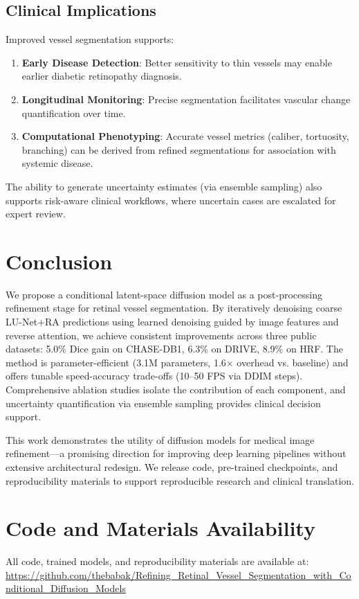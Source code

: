 \documentclass[11pt]{article}
\begin{document}
\subsection{Clinical Implications}

Improved vessel segmentation supports:
\begin{enumerate}
    \item \textbf{Early Disease Detection}: Better sensitivity to thin vessels may enable earlier diabetic retinopathy diagnosis.
    \item \textbf{Longitudinal Monitoring}: Precise segmentation facilitates vascular change quantification over time.
    \item \textbf{Computational Phenotyping}: Accurate vessel metrics (caliber, tortuosity, branching) can be derived from refined segmentations for association with systemic disease.
\end{enumerate}

The ability to generate uncertainty estimates (via ensemble sampling) also supports risk-aware clinical workflows, where uncertain cases are escalated for expert review.

\section{Conclusion}
\label{sec:conclusion}

We propose a conditional latent-space diffusion model as a post-processing refinement stage for retinal vessel segmentation. By iteratively denoising coarse LU-Net+RA predictions using learned denoising guided by image features and reverse attention, we achieve consistent improvements across three public datasets: 5.0\% Dice gain on CHASE-DB1, 6.3\% on DRIVE, 8.9\% on HRF. The method is parameter-efficient (3.1M parameters, 1.6$\times$ overhead vs. baseline) and offers tunable speed-accuracy trade-offs (10--50 FPS via DDIM steps). Comprehensive ablation studies isolate the contribution of each component, and uncertainty quantification via ensemble sampling provides clinical decision support.

This work demonstrates the utility of diffusion models for medical image refinement—a promising direction for improving deep learning pipelines without extensive architectural redesign. We release code, pre-trained checkpoints, and reproducibility materials to support reproducible research and clinical translation.
\section*{Code and Materials Availability}
All code, trained models, and reproducibility materials are available at: 
\url{https://github.com/thebabak/Refining_Retinal_Vessel_Segmentation_with_Conditional_Diffusion_Models}
\end{document}
